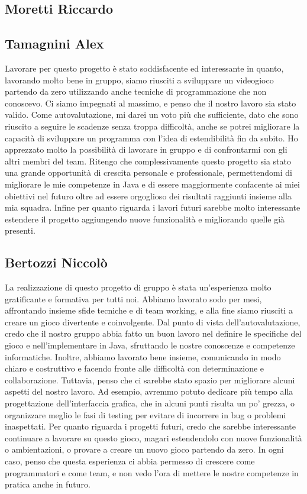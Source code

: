 \documentclass[a4paper,12pt]{report}
\begin{document}
\subsection*{Moretti Riccardo}

\subsection*{Tamagnini Alex}
Lavorare per questo progetto è stato soddisfacente ed interessante in quanto, lavorando molto bene in gruppo, siamo riusciti a sviluppare un videogioco partendo da zero utilizzando anche tecniche di programmazione che non conoscevo. Ci siamo impegnati al massimo, e penso che il nostro lavoro sia stato valido.
Come autovalutazione, mi darei un voto più che sufficiente, dato che sono riuscito a seguire le scadenze senza troppa difficoltà, anche se potrei migliorare la capacità di sviluppare un programma con l'idea di estendibilità fin da subito.
Ho apprezzato molto la possibilità di lavorare in gruppo e di confrontarmi con gli altri membri del team. Ritengo che complessivamente questo progetto sia stato una grande opportunità di crescita personale e professionale, permettendomi di migliorare le mie competenze in Java e di essere maggiormente confacente ai miei obiettivi nel futuro oltre ad essere orgoglioso dei risultati raggiunti insieme alla mia squadra.
Infine per quanto riguarda i lavori futuri sarebbe molto interessante estendere il progetto aggiungendo nuove funzionalità e migliorando quelle già presenti.

\subsection*{Bertozzi Niccolò}
La realizzazione di questo progetto di gruppo è stata un'esperienza molto gratificante e formativa per tutti noi. Abbiamo lavorato sodo per mesi, affrontando insieme sfide tecniche e di team working, e alla fine siamo riusciti a creare un gioco divertente e coinvolgente.
Dal punto di vista dell'autovalutazione, credo che il nostro gruppo abbia fatto un buon lavoro nel definire le specifiche del gioco e nell'implementare in Java, sfruttando le nostre conoscenze e competenze informatiche. Inoltre, abbiamo lavorato bene insieme, comunicando in modo chiaro e costruttivo e facendo fronte alle difficoltà con determinazione e collaborazione.
Tuttavia, penso che ci sarebbe stato spazio per migliorare alcuni aspetti del nostro lavoro. Ad esempio, avremmo potuto dedicare più tempo alla progettazione dell'interfaccia grafica, che in alcuni punti risulta un po' grezza, o organizzare meglio le fasi di testing per evitare di incorrere in bug o problemi inaspettati.
Per quanto riguarda i progetti futuri, credo che sarebbe interessante continuare a lavorare su questo gioco, magari estendendolo con nuove funzionalità o ambientazioni, o provare a creare un nuovo gioco partendo da zero. In ogni caso, penso che questa esperienza ci abbia permesso di crescere come programmatori e come team, e non vedo l'ora di mettere le nostre competenze in pratica anche in futuro.
\end{document}
